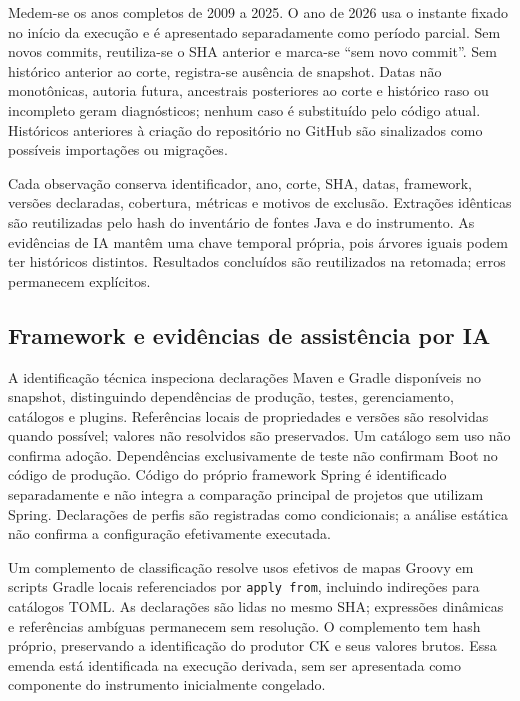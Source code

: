 Medem-se os anos completos de 2009 a 2025. O ano de 2026 usa o instante fixado no início da execução e é apresentado separadamente como período parcial. Sem novos commits, reutiliza-se o SHA anterior e marca-se ``sem novo commit''. Sem histórico anterior ao corte, registra-se ausência de snapshot. Datas não monotônicas, autoria futura, ancestrais posteriores ao corte e histórico raso ou incompleto geram diagnósticos; nenhum caso é substituído pelo código atual. Históricos anteriores à criação do repositório no GitHub são sinalizados como possíveis importações ou migrações.

Cada observação conserva identificador, ano, corte, SHA, datas, framework, versões declaradas, cobertura, métricas e motivos de exclusão. Extrações idênticas são reutilizadas pelo hash do inventário de fontes Java e do instrumento. As evidências de IA mantêm uma chave temporal própria, pois árvores iguais podem ter históricos distintos. Resultados concluídos são reutilizados na retomada; erros permanecem explícitos.

\subsection{Framework e evidências de assistência por IA}
\label{subsec:identificacao-ia}

A identificação técnica inspeciona declarações Maven e Gradle disponíveis no snapshot, distinguindo dependências de produção, testes, gerenciamento, catálogos e plugins. Referências locais de propriedades e versões são resolvidas quando possível; valores não resolvidos são preservados. Um catálogo sem uso não confirma adoção. Dependências exclusivamente de teste não confirmam Boot no código de produção. Código do próprio framework Spring é identificado separadamente e não integra a comparação principal de projetos que utilizam Spring. Declarações de perfis são registradas como condicionais; a análise estática não confirma a configuração efetivamente executada.

Um complemento de classificação resolve usos efetivos de mapas Groovy em scripts Gradle locais referenciados por \texttt{apply from}, incluindo indireções para catálogos TOML. As declarações são lidas no mesmo SHA; expressões dinâmicas e referências ambíguas permanecem sem resolução. O complemento tem hash próprio, preservando a identificação do produtor CK e seus valores brutos. Essa emenda está identificada na execução derivada, sem ser apresentada como componente do instrumento inicialmente congelado.

